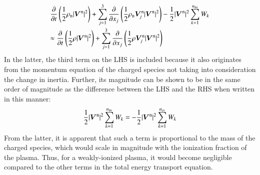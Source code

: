 \documentclass{warpdoc}
\newcommand{\alb}{\vspace{0.1cm}\\} %
\newcommand{\mfd}{\displaystyle}
\newcommand{\nns}{{n_{\rm ns}}}
\newcommand{\ncs}{{n_{\rm cs}}}
\renewcommand{\vec}[1]{\bm{#1}}
\begin{document}
%
\begin{equation}
\begin{array}{l}\mfd
\frac{\partial }{\partial t} \left(\frac{1}{2}\rho_{\rm n}|\vec{V}^{\rm n}|^2\right)
+ \sum_{j=1}^3  \frac{\partial }{\partial x_j} \left(
\frac{1}{2}\rho_{\rm n}\vec{V}^{\rm n}_j|\vec{V}^{\rm n}|^2
\right)
-\frac{1}{2}|\vec{V}^{\rm n}|^2 \sum_{k=1}^\nns W_k\alb\mfd
\approx
\frac{\partial }{\partial t} \left(\frac{1}{2}\rho |\vec{V}^{\rm n}|^2\right)
+ \sum_{j=1}^3  \frac{\partial }{\partial x_j} \left(
\frac{1}{2}\rho \vec{V}^{\rm n}_j|\vec{V}^{\rm n}|^2
\right)
\end{array}
\label{eqn:etotal2}
\end{equation}
%
In the latter, the third term on the LHS is included because it also originates from the momentum equation of the charged species not taking into consideration the change in inertia. Further, its magnitude can be shown to be in the same order of magnitude as the difference between the LHS and the RHS when written in this manner:
%
\begin{equation}
\frac{1}{2}|\vec{V}^{\rm n}|^2 \sum_{k=1}^\nns W_k =
-\frac{1}{2}|\vec{V}^{\rm n}|^2 \sum_{k=1}^\ncs W_k
\end{equation}
%   
From the latter, it is apparent that such a term is proportional to the mass of the charged species, which would scale in magnitude with the ionization fraction of the plasma. Thus, for a weakly-ionized plasma, it would become negligible compared to the other terms in the total energy transport equation. 
\end{document}

